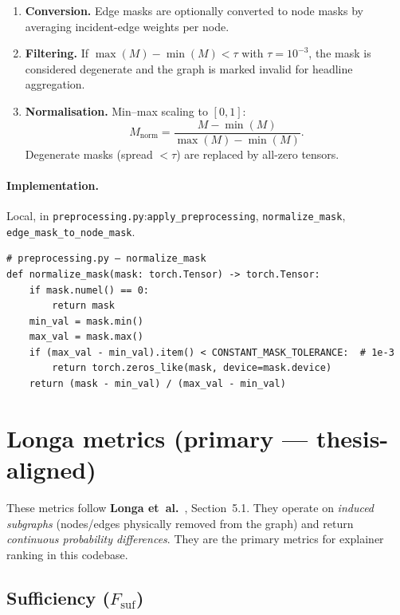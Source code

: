 \documentclass[11pt,a4paper]{article}
\newcommand{\code}[1]{\texttt{#1}}
\begin{document}
\begin{enumerate}
  \item \textbf{Conversion.}  Edge masks are optionally converted to node
        masks by averaging incident-edge weights per node.
  \item \textbf{Filtering.}  If $\max(M) - \min(M) < \tau$ with
        $\tau = 10^{-3}$, the mask is considered degenerate and the graph is
        marked invalid for headline aggregation.
  \item \textbf{Normalisation.}  Min--max scaling to $[0,1]$:
        \[
          M_{\text{norm}} = \frac{M - \min(M)}{\max(M) - \min(M)}.
        \]
        Degenerate masks (spread $ < \tau$) are replaced by all-zero tensors.
\end{enumerate}

\paragraph{Implementation.}  Local, in
\code{preprocessing.py}:\code{apply\_preprocessing},
\code{normalize\_mask}, \code{edge\_mask\_to\_node\_mask}.

\begin{verbatim}
# preprocessing.py — normalize_mask
def normalize_mask(mask: torch.Tensor) -> torch.Tensor:
    if mask.numel() == 0:
        return mask
    min_val = mask.min()
    max_val = mask.max()
    if (max_val - min_val).item() < CONSTANT_MASK_TOLERANCE:  # 1e-3
        return torch.zeros_like(mask, device=mask.device)
    return (mask - min_val) / (max_val - min_val)
\end{verbatim}


\section{Longa metrics (primary — thesis-aligned)}
\label{sec:longa}

These metrics follow \textbf{Longa et~al.}~\cite{longa2025}, Section~5.1.
They operate on \emph{induced subgraphs} (nodes/edges physically removed from
the graph) and return \emph{continuous probability differences}.  They are the
primary metrics for explainer ranking in this codebase.


\subsection{Sufficiency (\texorpdfstring{$F_{\mathrm{suf}}$}{Fsuf})}
\label{sec:fsuf}
\end{document}
